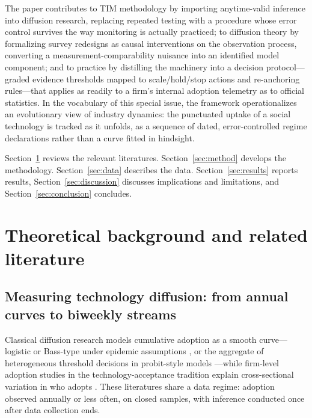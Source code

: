 \documentclass[review,authoryear,12pt]{elsarticle}
\begin{document}
The paper contributes to TIM methodology by importing anytime-valid inference into diffusion research, replacing repeated testing with a procedure whose error control survives the way monitoring is actually practiced; to diffusion theory by formalizing survey redesigns as causal interventions on the observation process, converting a measurement-comparability nuisance \citep{crane2025} into an identified model component; and to practice by distilling the machinery into a decision protocol---graded evidence thresholds mapped to scale/hold/stop actions and re-anchoring rules---that applies as readily to a firm's internal adoption telemetry as to official statistics. In the vocabulary of this special issue, the framework operationalizes an evolutionary view of industry dynamics: the punctuated uptake of a social technology is tracked as it unfolds, as a sequence of dated, error-controlled regime declarations rather than a curve fitted in hindsight.

Section~\ref{sec:lit} reviews the relevant literatures. Section~\ref{sec:method} develops the methodology. Section~\ref{sec:data} describes the data. Section~\ref{sec:results} reports results, Section~\ref{sec:discussion} discusses implications and limitations, and Section~\ref{sec:conclusion} concludes.

\section{Theoretical background and related literature}
\label{sec:lit}

\subsection{Measuring technology diffusion: from annual curves to biweekly streams}

Classical diffusion research models cumulative adoption as a smooth curve---logistic or Bass-type under epidemic assumptions \citep{bass1969}, or the aggregate of heterogeneous threshold decisions in probit-style models \citep{geroski2000,rogers2003}---while firm-level adoption studies in the technology-acceptance tradition explain cross-sectional variation in who adopts \citep{davis1989}. These literatures share a data regime: adoption observed annually or less often, on closed samples, with inference conducted once after data collection ends.
\end{document}
